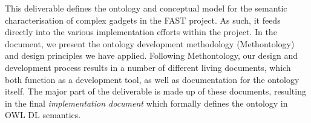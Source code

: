 \documentclass{fast_latex}
\begin{document}
This deliverable defines the ontology and conceptual model for the semantic characterisation of complex gadgets in the FAST project. As such, it feeds directly into the various implementation efforts within the project. In the document, we present the ontology development methodology (Methontology) and design principles we have applied. Following Methontology, our design and development process results in a number of different living documents, which both function as a development tool, as well as documentation for the ontology itself. The major part of the deliverable is made up of these documents, resulting in the final \emph{implementation document} which formally defines the ontology in OWL DL semantics.

\newpage


\clearpage
\end{document}
